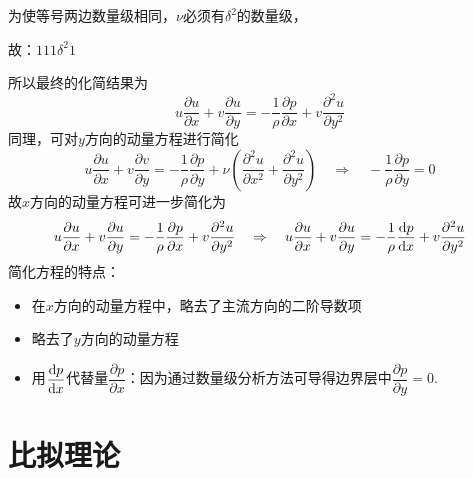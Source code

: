 \begin{enumerate}[\hspace*{2em} (1)]
	为使等号两边数量级相同，$\nu$必须有$\delta^2$的数量级，
	
	故：\hspace*{4.5cm}$1$\hspace*{0.8cm}$ 1$\hspace*{1.2cm}$1$\hspace*{0.95cm}$\delta^2$\hspace*{1cm}$1$
	
	所以最终的化简结果为
	\begin{equation}
		u \dfrac{\partial u}{\partial x} + v \dfrac{\partial u}{\partial y} = - \dfrac{1}{\rho} \dfrac{\partial p}{\partial x} + v \dfrac{\partial^2 u}{\partial y^2}
	\end{equation}
	同理，可对$y$方向的动量方程进行简化
	\begin{equation}
		u\dfrac{\partial u}{\partial x} + v \dfrac{\partial v}{\partial y} = - \dfrac{1}{\rho} \dfrac{\partial p}{\partial y} + \nu \left(\dfrac{\partial^2 u}{\partial x^2} + \dfrac{\partial^2 u}{\partial y^2}\right) \quad \Rightarrow \quad - \dfrac{1}{\rho}\dfrac{\partial p}{\partial y} = 0
	\end{equation}
	故$x$方向的动量方程可进一步简化为
	\begin{equation}
		u \dfrac{\partial u}{\partial x} + v \dfrac{\partial u}{\partial y} = - \dfrac{1}{\rho} \dfrac{\partial p}{\partial x} + v \dfrac{\partial^2 u}{\partial y^2} \quad \Rightarrow \quad u \dfrac{\partial u}{\partial x} + v \dfrac{\partial u}{\partial y} = - \dfrac{1}{\rho} \dfrac{{\rm{d}} p}{{\rm{d}} x} + v \dfrac{\partial^2 u}{\partial y^2}
	\end{equation}
	\clearpage
	简化方程的特点：
	\begin{itemize}
		\item 在$x$方向的动量方程中，略去了主流方向的二阶导数项
		\item 略去了$y$方向的动量方程
		\item 用$\dfrac{{\rm{d}} p}{{\rm{d}} x}$代替量$\dfrac{\partial p}{\partial x}$：因为通过数量级分析方法可导得边界层中$\dfrac{\partial p}{\partial y} = 0.$
	\end{itemize}
\end{enumerate}

\section{比拟理论}
